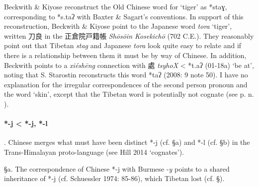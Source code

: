 Beckwith \& Kiyose reconstruct the Old Chinese word for `tiger' as
*staɣ, corresponding to *s.taʔ with Baxter \& Sagart's conventions. In
support of this reconstruction, Beckwith \& Kiyose point to the Japanese
word \emph{tora} `tiger', written 刀良 in the 正倉院戸籍帳 \emph{Shōsōin
Kosekichō} (702 C.E.). They rea­son­ably point out that Tibetan 
{} \emph{stag} and Japanese \emph{tora} look quite easy to relate and if
there is a relationship between them it must be by way of Chinese. In
addition, Beckwith points to a  \emph{xiéshēng} connection with 處
 \emph{tsyhoX} \textless{} *t.{}aʔ (01-18a) `be at', noting that S.
Starostin re­con­structs this word *t{}aʔ (2008: 9 note 50). I have no
explanation for the irregular cor­re­spondences of the second person
pronoun and the word `skin', except that the Tibetan word is potentially
not cognate (see p. n. ).

\paragraph{*-j \textless{} *-j, *-l}. Chinese merges what must
have been distinct *-j (cf. §a) and *-l (cf. §b) in the Trans-Himalayan
proto-language (see Hill 2014 `cognates').

§a. The correspondence of Chinese *-j with Burmese -\emph{y} points to a
shared inheritance of *‑j (cf. Schuessler 1974: 85-86), which Tibetan
lost (cf. §).

